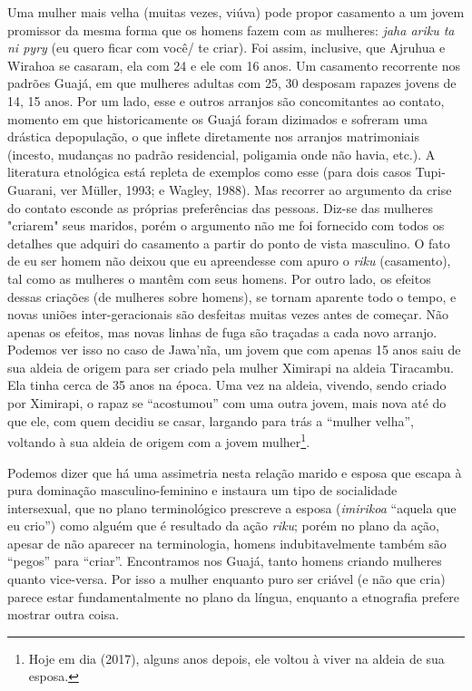 Uma mulher mais velha (muitas vezes, viúva) pode propor casamento a um
jovem promissor da mesma forma que os homens fazem com as mulheres:
\emph{jaha ariku ta ni pyry} (eu quero ficar com você/ te criar). Foi
assim, inclusive, que Ajruhua e Wirahoa se casaram, ela com 24 e ele com
16 anos. Um casamento recorrente nos padrões Guajá, em que mulheres
adultas com 25, 30 desposam rapazes jovens de 14, 15 anos. Por um lado,
esse e outros arranjos são concomitantes ao contato, momento em que
historicamente os Guajá foram dizimados e sofreram uma drástica
depopulação, o que inflete diretamente nos arranjos matrimoniais
(incesto, mudanças no padrão residencial, poligamia onde não havia,
etc.). A literatura etnológica está repleta de exemplos como esse (para
dois casos Tupi-Guarani, ver Müller, 1993; e Wagley, 1988). Mas recorrer
ao argumento da crise do contato esconde as próprias preferências das
pessoas. Diz-se das mulheres "criarem" seus maridos, porém o argumento
não me foi fornecido com todos os detalhes que adquiri do casamento a
partir do ponto de vista masculino. O fato de eu ser homem não deixou
que eu apreendesse com apuro o \emph{riku} (casamento), tal como as
mulheres o mantêm com seus homens. Por outro lado, os efeitos dessas
criações (de mulheres sobre homens), se tornam aparente todo o tempo, e
novas uniões inter-geracionais são desfeitas muitas vezes antes de
começar. Não apenas os efeitos, mas novas linhas de fuga são traçadas a
cada novo arranjo. Podemos ver isso no caso de Jawa'nĩa, um jovem que
com apenas 15 anos saiu de sua aldeia de origem para ser criado pela
mulher Ximirapi na aldeia Tiracambu. Ela tinha cerca de 35 anos na
época. Uma vez na aldeia, vivendo, sendo criado por Ximirapi, o rapaz se
``acostumou'' com uma outra jovem, mais nova até do que ele, com quem
decidiu se casar, largando para trás a ``mulher velha'', voltando à sua
aldeia de origem com a jovem mulher\footnote{Hoje em dia (2017), alguns
  anos depois, ele voltou à viver na aldeia de sua esposa.}.

Podemos dizer que há uma assimetria nesta relação marido e esposa que
escapa à pura dominação masculino-feminino e instaura um tipo de
socialidade intersexual, que no plano terminológico prescreve a esposa
(\emph{imirikoa} ``aquela que eu crio'') como alguém que é resultado da
ação \emph{riku}; porém no plano da ação, apesar de não aparecer na
terminologia, homens indubitavelmente também são ``pegos'' para
``criar''. Encontramos nos Guajá, tanto homens criando mulheres quanto
vice-versa. Por isso a mulher enquanto puro ser criável (e não que cria)
parece estar fundamentalmente no plano da língua, enquanto a etnografia
prefere mostrar outra coisa.

